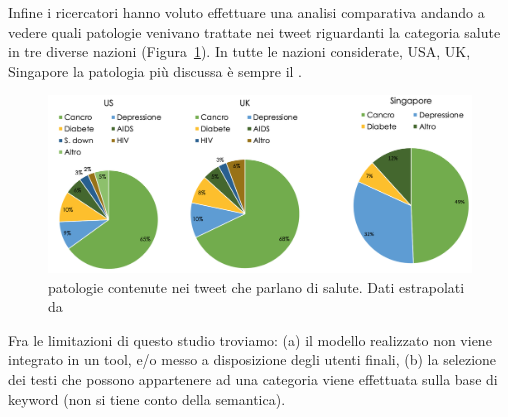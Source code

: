 Infine i ricercatori hanno voluto effettuare una analisi comparativa andando a vedere quali patologie venivano trattate nei tweet riguardanti la categoria salute in tre diverse nazioni (Figura~\ref{fig:res-patologie-nazioni}). In tutte le nazioni considerate, USA, UK, Singapore la patologia più discussa è sempre il .

\begin{figure}[h!t]
    \centering
    \includegraphics[width=15cm]{Figure/related_work/nazioni.png}
    \caption{patologie contenute nei tweet che parlano di salute. Dati estrapolati da\cite{looseTweets}}
    \label{fig:res-patologie-nazioni}
\end{figure}
\FloatBarrier


Fra le limitazioni di questo studio troviamo: (a) il modello realizzato non viene integrato in un tool, e/o messo a disposizione degli utenti finali, (b) la selezione dei testi che possono appartenere ad una categoria viene effettuata sulla base di keyword (non si tiene conto della semantica).


